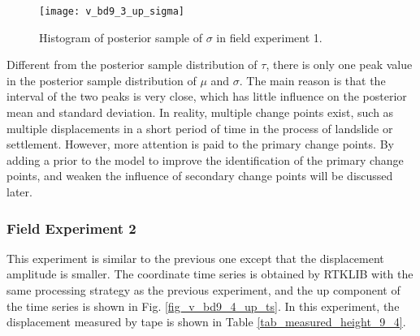 \documentclass[journal]{IEEEtran}
\begin{document}
\begin{figure}[htbp]
	\centering
	\texttt{[image: v\_bd9\_3\_up\_sigma]}
	\caption{Histogram of posterior sample of $\sigma$ in field experiment 1.}
	\label{fig_v_bd9_3_up_sigma}
\end{figure} 
Different from the posterior sample distribution of $\tau$, there is only one peak value in the posterior sample distribution of $\mu$ and $\sigma$.
The main reason is that the interval of the two peaks is very close, which has little influence on the posterior mean and standard deviation.
In reality, multiple change points exist, such as multiple displacements in a short period of time in the process of landslide or settlement.
However, more attention is paid to the primary change points.
By adding a prior to the model to improve the identification of the primary change points, and weaken the influence of secondary change points will be discussed later.

\subsubsection{Field Experiment 2}
This experiment is similar to the previous one except that the displacement amplitude is smaller. 
The coordinate time series is obtained by RTKLIB with the same processing strategy as the previous experiment, and the up component of the time series is shown in Fig. \ref{fig_v_bd9_4_up_ts}. 
In this experiment, the displacement measured by tape is shown in Table \ref{tab_measured_height_9_4}.
\end{document}
